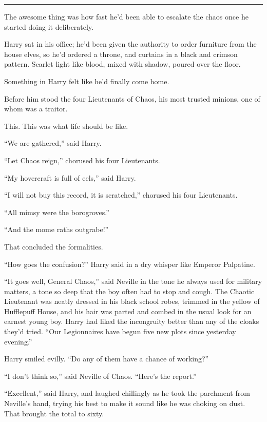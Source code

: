\begin{center}\rule{3in}{0.4pt}\end{center}

The awesome thing was how fast he'd been able to escalate the chaos once he started doing it deliberately.

Harry sat in his office; he'd been given the authority to order furniture from the house elves, so he'd ordered a throne, and curtains in a black and crimson pattern. Scarlet light like blood, mixed with shadow, poured over the floor.

Something in Harry felt like he'd finally come home.

Before him stood the four Lieutenants of Chaos, his most trusted minions, one of whom was a traitor.

This. This was what life should be like.

``We are gathered,'' said Harry.

``Let Chaos reign,'' chorused his four Lieutenants.

``My hovercraft is full of eels,'' said Harry.

``I will not buy this record, it is scratched,'' chorused his four Lieutenants.

``All mimsy were the borogroves.''

``And the mome raths outgrabe!''

That concluded the formalities.

``How goes the confusion?'' Harry said in a dry whisper like Emperor Palpatine.

``It goes well, General Chaos,'' said Neville in the tone he always used for military matters, a tone so deep that the boy often had to stop and cough. The Chaotic Lieutenant was neatly dressed in his black school robes, trimmed in the yellow of Hufflepuff House, and his hair was parted and combed in the usual look for an earnest young boy. Harry had liked the incongruity better than any of the cloaks they'd tried. ``Our Legionnaires have begun five new plots since yesterday evening.''

Harry smiled evilly. ``Do any of them have a chance of working?''

``I don't think so,'' said Neville of Chaos. ``Here's the report.''

``Excellent,'' said Harry, and laughed chillingly as he took the parchment from Neville's hand, trying his best to make it sound like he was choking on dust. That brought the total to sixty.

